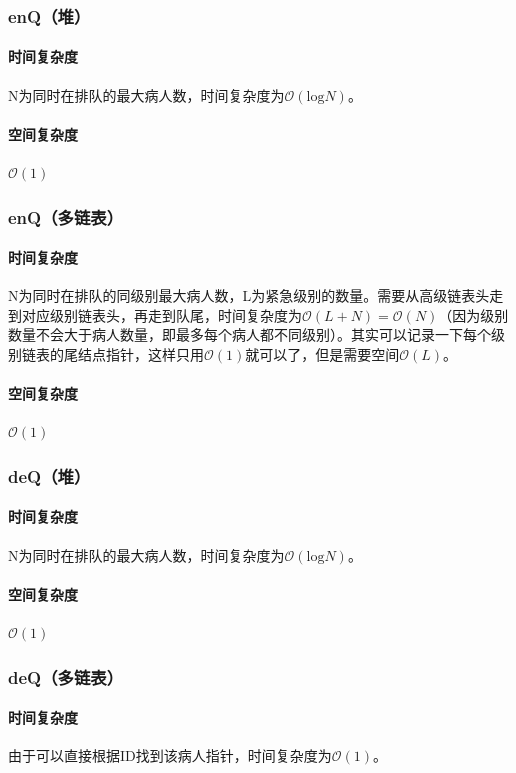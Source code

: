 \documentclass{homework}
\begin{document}
    \subsubsection{enQ（堆）}
    \paragraph{时间复杂度}N为同时在排队的最大病人数，时间复杂度为$\mathcal{O}(\mathrm{log}N)$。
    \paragraph{空间复杂度}$\mathcal{O}(1)$
    \subsubsection{enQ（多链表）}
    \paragraph{时间复杂度}N为同时在排队的同级别最大病人数，L为紧急级别的数量。需要从高级链表头走到对应级别链表头，再走到队尾，时间复杂度为$\mathcal{O}(L+N)=\mathcal{O}(N)$（因为级别数量不会大于病人数量，即最多每个病人都不同级别）。其实可以记录一下每个级别链表的尾结点指针，这样只用$\mathcal{O}(1)$就可以了，但是需要空间$\mathcal{O}(L)$。
    \paragraph{空间复杂度}$\mathcal{O}(1)$
    \subsubsection{deQ（堆）}
    \paragraph{时间复杂度}N为同时在排队的最大病人数，时间复杂度为$\mathcal{O}(\mathrm{log}N)$。
    \paragraph{空间复杂度}$\mathcal{O}(1)$
    \subsubsection{deQ（多链表）}
    \paragraph{时间复杂度}由于可以直接根据ID找到该病人指针，时间复杂度为$\mathcal{O}(1)$。
\end{document}
